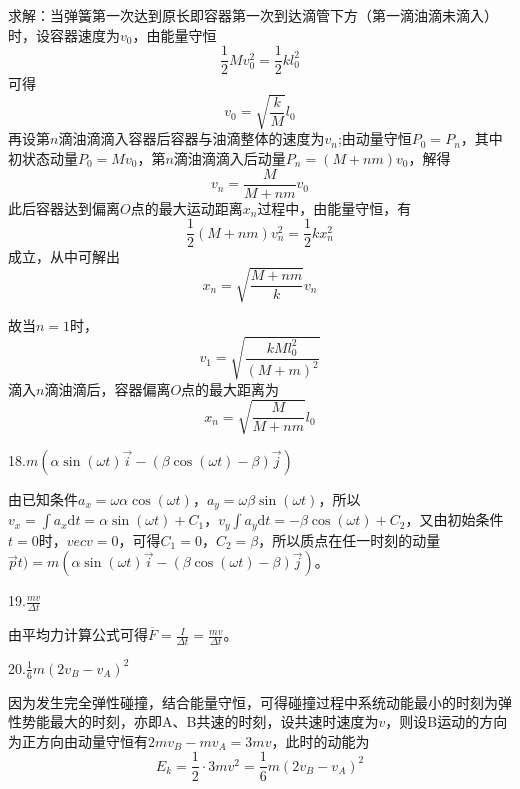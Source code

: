 \documentclass[b5paper,opensource]{./template/qyxf-book}
\newcommand{\di}[1]{\mathrm{d}#1}
\begin{document}
		求解：当弹簧第一次达到原长即容器第一次到达滴管下方（第一滴油滴未滴入）时，设容器速度为$v_0$，由能量守恒
		\begin{equation*}
		\frac{1}{2}Mv_0^2=\frac{1}{2}kl_0^2
		\end{equation*}
		可得
		\begin{equation*}
		v_0=\sqrt{\frac{k}{M}}l_0
		\end{equation*}
		再设第$n$滴油滴滴入容器后容器与油滴整体的速度为$v_n$;由动量守恒$P_0=P_n$，其中初状态动量$P_0=Mv_0$，第$n$滴油滴滴入后动量$P_n=(M+nm)v_0$，解得
		\begin{equation*}
		v_n=\frac{M}{M+nm}v_0
		\end{equation*}
		此后容器达到偏离$O$点的最大运动距离$x_n$过程中，由能量守恒，有
		\begin{equation*}
		\frac{1}{2}(M+nm)v_n^2=\frac{1}{2}kx_n^2
		\end{equation*}
		成立，从中可解出
		\begin{equation*}
		x_n=\sqrt{\frac{M+nm}{k}}v_n
		\end{equation*}
		
		故当$n=1$时，
		\begin{equation*}
		v_1=\sqrt{\frac{kMl_0^2}{(M+m)^2}}
		\end{equation*}
		滴入$n$滴油滴后，容器偏离$O$点的最大距离为
		\begin{equation*}
		x_n=\sqrt{\frac{M}{M+nm}}l_0
		\end{equation*}
		
		18.$m(\alpha\sin(\omega t)\vec{i}-(\beta\cos(\omega t)-\beta)\vec{j})$
		
		由已知条件$a_x=\omega\alpha\cos(\omega t)，a_y=\omega\beta\sin(\omega t)$，所以$v_x=\int a_x\di t=\alpha\sin(\omega t)+C_1，v_y\int a_y\di t=-\beta\cos(\omega t)+C_2$，又由初始条件$t=0$时，$vec{v}=0$，可得$C_1=0，C_2=\beta$，所以质点在任一时刻的动量$\vec{p}t)=m(\alpha\sin(\omega t)\vec{i}-(\beta\cos(\omega t)-\beta)\vec{j})$。
		
		19.$\frac{mv}{\Delta t}$
		
		由平均力计算公式可得$\overline{F}=\frac{I}{\Delta t}=\frac{mv}{\Delta t}$。
		
		20.$\frac{1}{6}m(2v_B-v_A)^2$
		
		因为发生完全弹性碰撞，结合能量守恒，可得碰撞过程中系统动能最小的时刻为弹性势能最大的时刻，亦即A、B共速的时刻，设共速时速度为$v$，则设B运动的方向为正方向由动量守恒有$2mv_B-mv_A=3mv$，此时的动能为
		\begin{equation*}
		E_k=\frac{1}{2}\cdot 3mv^2=\frac{1}{6}m(2v_B-v_A)^2
		\end{equation*}
\end{document}

